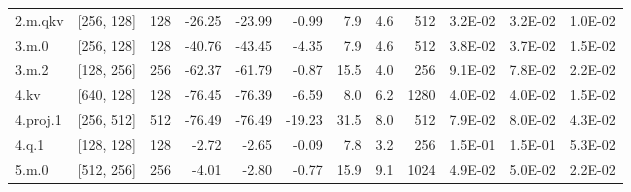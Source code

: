\begin{table}
\begin{tabular}{llrrrrrrrrrr}
2.m.qkv & [256, 128] & 128 & {\cellcolor[HTML]{FECE7C}} \color[HTML]{000000} -26.25 & {\cellcolor[HTML]{FED683}} \color[HTML]{000000} -23.99 & {\cellcolor[HTML]{ECF7A6}} \color[HTML]{000000} -0.99 & 7.9 & 4.6 & 512 & {\cellcolor[HTML]{E0F295}} \color[HTML]{000000} 3.2E-02 & {\cellcolor[HTML]{E0F295}} \color[HTML]{000000} 3.2E-02 & {\cellcolor[HTML]{BDE379}} \color[HTML]{000000} 1.0E-02 \\
3.m.0 & [256, 128] & 128 & {\cellcolor[HTML]{F99355}} \color[HTML]{000000} -40.76 & {\cellcolor[HTML]{F8864F}} \color[HTML]{F1F1F1} -43.45 & {\cellcolor[HTML]{F5FBB2}} \color[HTML]{000000} -4.35 & 7.9 & 4.6 & 512 & {\cellcolor[HTML]{E8F59F}} \color[HTML]{000000} 3.8E-02 & {\cellcolor[HTML]{E8F59F}} \color[HTML]{000000} 3.7E-02 & {\cellcolor[HTML]{C5E67E}} \color[HTML]{000000} 1.5E-02 \\
3.m.2 & [128, 256] & 256 & {\cellcolor[HTML]{D83128}} \color[HTML]{F1F1F1} -62.37 & {\cellcolor[HTML]{D93429}} \color[HTML]{F1F1F1} -61.79 & {\cellcolor[HTML]{ECF7A6}} \color[HTML]{000000} -0.87 & 15.5 & 4.0 & 256 & {\cellcolor[HTML]{FED481}} \color[HTML]{000000} 9.1E-02 & {\cellcolor[HTML]{FEE797}} \color[HTML]{000000} 7.8E-02 & {\cellcolor[HTML]{D1EC86}} \color[HTML]{000000} 2.2E-02 \\
4.kv & [640, 128] & 128 & {\cellcolor[HTML]{A50026}} \color[HTML]{F1F1F1} -76.45 & {\cellcolor[HTML]{A50026}} \color[HTML]{F1F1F1} -76.39 & {\cellcolor[HTML]{FBFDBA}} \color[HTML]{000000} -6.59 & 8.0 & 6.2 & 1280 & {\cellcolor[HTML]{EBF7A3}} \color[HTML]{000000} 4.0E-02 & {\cellcolor[HTML]{EBF7A3}} \color[HTML]{000000} 4.0E-02 & {\cellcolor[HTML]{C7E77F}} \color[HTML]{000000} 1.5E-02 \\
4.proj.1 & [256, 512] & 512 & {\cellcolor[HTML]{A50026}} \color[HTML]{F1F1F1} -76.49 & {\cellcolor[HTML]{A50026}} \color[HTML]{F1F1F1} -76.49 & {\cellcolor[HTML]{FEE593}} \color[HTML]{000000} -19.23 & 31.5 & 8.0 & 512 & {\cellcolor[HTML]{FEE695}} \color[HTML]{000000} 7.9E-02 & {\cellcolor[HTML]{FEE593}} \color[HTML]{000000} 8.0E-02 & {\cellcolor[HTML]{EEF8A8}} \color[HTML]{000000} 4.3E-02 \\
4.q.1 & [128, 128] & 128 & {\cellcolor[HTML]{F1F9AC}} \color[HTML]{000000} -2.72 & {\cellcolor[HTML]{F1F9AC}} \color[HTML]{000000} -2.65 & {\cellcolor[HTML]{E9F6A1}} \color[HTML]{000000} -0.09 & 7.8 & 3.2 & 256 & {\cellcolor[HTML]{EE613E}} \color[HTML]{F1F1F1} 1.5E-01 & {\cellcolor[HTML]{EB5A3A}} \color[HTML]{F1F1F1} 1.5E-01 & {\cellcolor[HTML]{FBFDBA}} \color[HTML]{000000} 5.3E-02 \\
5.m.0 & [512, 256] & 256 & {\cellcolor[HTML]{F5FBB2}} \color[HTML]{000000} -4.01 & {\cellcolor[HTML]{F1F9AC}} \color[HTML]{000000} -2.80 & {\cellcolor[HTML]{ECF7A6}} \color[HTML]{000000} -0.77 & 15.9 & 9.1 & 1024 & {\cellcolor[HTML]{F5FBB2}} \color[HTML]{000000} 4.9E-02 & {\cellcolor[HTML]{F8FCB6}} \color[HTML]{000000} 5.0E-02 & {\cellcolor[HTML]{D3EC87}} \color[HTML]{000000} 2.2E-02 \\

\end{tabular}
\end{table}
